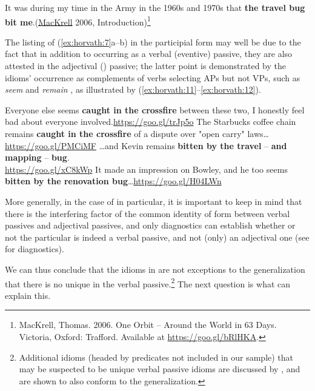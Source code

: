 \documentclass[output=paper,
modfonts
]{LSP/langsci}
\begin{document}
\ex \label{ex:horvath:10} It was during my time in the Army in the 1960s and 1970s that \textbf{the travel bug bit me}.\hfill (\href{https://books.google.co.il/books?isbn=1412078369}{MacKrell} 2006,
Introduction)\footnote{MacKrell, Thomas. 2006. One Orbit -- Around the
  World in 63 Days. Victoria, Oxford: Trafford. Available at
  \url{https://goo.gl/bRlHKA}.}
\z

The listing of (\ref{ex:horvath:7}a--b) in the  participial form may well be due to
the fact that in addition to occurring as a verbal (eventive) passive,
they are also attested in the adjectival () passive; the latter
point is demonstrated by the idioms' occurrence as complements of verbs
selecting APs but not VPs, such as \emph{seem} and \emph{remain} \citep{wasow1977},
as illustrated by (\ref{ex:horvath:11}--\ref{ex:horvath:12}).

\ea \label{ex:horvath:11}
	\ea \label{ex:horvath:11a} Everyone else seems \textbf{caught in the crossfire} between these two, 
	I honestly feel bad about everyone involved.\hfill \url{https://goo.gl/trJp5o}
	\ex \label{ex:horvath:11b} The Starbucks coffee chain remains \textbf{caught in the crossfire}
	of a dispute over "open carry" laws\ldots{}\hfill \url{https://goo.gl/PMCiMF}
	\z
\ex \label{ex:horvath:12}
	\ea \label{ex:horvath:12a} \ldots{}and Kevin remains \textbf{bitten by the travel} -- \textbf{and}
	\textbf{mapping} -- \textbf{bug}.\\
	\hfill \url{https://goo.gl/xC8kWp}
	\ex \label{ex:horvath:12b} It made an impression on Bowley, and he too seems \textbf{bitten by
	the renovation bug}\ldots{}\hfill \url{https://goo.gl/H04LWn}
	\z
\z

More generally, in the case of  in particular, it is important to
keep in mind that there is the interfering factor of the common identity
of form between verbal passives and adjectival passives, and only
diagnostics can establish whether or not the particular  is indeed
a verbal passive, and not (only) an adjectival  one (see \citealt{wasow1977} for diagnostics).

We can thus conclude that the idioms in  are not exceptions to the
generalization that there is no unique  in the verbal
passive.\footnote{Additional idioms (headed by predicates not included
  in our sample) that may be suspected to be unique verbal passive
  idioms are discussed by \citet{horvath2016}, and are shown to
  also conform to the generalization.} The next question is what can
explain this.
\end{document}
